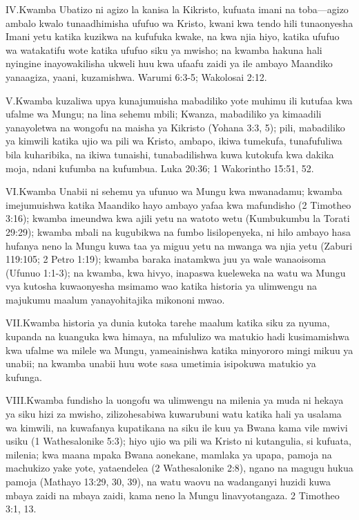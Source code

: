 \lettrine{IV.} Kwamba Ubatizo ni agizo la kanisa la Kikristo, kufuata imani na toba—agizo ambalo kwalo tunaadhimisha ufufuo wa Kristo, kwani kwa tendo hili tunaonyesha Imani yetu katika kuzikwa na kufufuka kwake, na kwa njia hiyo, katika ufufuo wa watakatifu wote katika ufufuo siku ya mwisho; na kwamba hakuna hali nyingine inayowakilisha ukweli huu kwa ufaafu zaidi ya ile ambayo Maandiko yanaagiza, yaani, kuzamishwa. Warumi 6:3-5; Wakolosai 2:12.


\lettrine{V.} Kwamba kuzaliwa upya kunajumuisha mabadiliko yote muhimu ili kutufaa kwa ufalme wa Mungu; na lina sehemu mbili; Kwanza, mabadiliko ya kimaadili yanayoletwa na wongofu na maisha ya Kikristo (Yohana 3:3, 5); pili, mabadiliko ya kimwili katika ujio wa pili wa Kristo, ambapo, ikiwa tumekufa, tunafufuliwa bila kuharibika, na ikiwa tunaishi, tunabadilishwa kuwa kutokufa kwa dakika moja, ndani kufumba na kufumbua. Luka 20:36; 1 Wakorintho 15:51, 52.


\lettrine{VI.} Kwamba Unabii ni sehemu ya ufunuo wa Mungu kwa mwanadamu; kwamba imejumuishwa katika Maandiko hayo ambayo yafaa kwa mafundisho (2 Timotheo 3:16); kwamba imeundwa kwa ajili yetu na watoto wetu (Kumbukumbu la Torati 29:29); kwamba mbali na kugubikwa na fumbo lisilopenyeka, ni hilo ambayo hasa hufanya neno la Mungu kuwa taa ya miguu yetu na mwanga wa njia yetu (Zaburi 119:105; 2 Petro 1:19); kwamba baraka inatamkwa juu ya wale wanaoisoma (Ufunuo 1:1-3); na kwamba, kwa hivyo, inapaswa kueleweka na watu wa Mungu vya kutosha kuwaonyesha msimamo wao katika historia ya ulimwengu na majukumu maalum yanayohitajika mikononi mwao.


\lettrine{VII.} Kwamba historia ya dunia kutoka tarehe maalum katika siku za nyuma, kupanda na kuanguka kwa himaya, na mfululizo wa matukio hadi kusimamishwa kwa ufalme wa milele wa Mungu, yameainishwa katika minyororo mingi mikuu ya unabii; na kwamba unabii huu wote sasa umetimia isipokuwa matukio ya kufunga.


\lettrine{VIII.} Kwamba fundisho la uongofu wa ulimwengu na milenia ya muda ni hekaya ya siku hizi za mwisho, zilizohesabiwa kuwarubuni watu katika hali ya usalama wa kimwili, na kuwafanya kupatikana na siku ile kuu ya Bwana kama vile mwivi usiku (1 Wathesalonike 5:3); hiyo ujio wa pili wa Kristo ni kutangulia, si kufuata, milenia; kwa maana mpaka Bwana aonekane, mamlaka ya upapa, pamoja na machukizo yake yote, yataendelea (2 Wathesalonike 2:8), ngano na magugu hukua pamoja (Mathayo 13:29, 30, 39), na watu waovu na wadanganyi huzidi kuwa mbaya zaidi na mbaya zaidi, kama neno la Mungu linavyotangaza. 2 Timotheo 3:1, 13.


